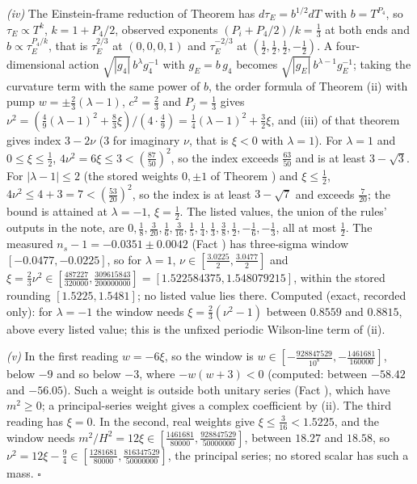 \emph{(iv)} The Einstein-frame reduction of Theorem  has $d\tau_{E} = b^{1/2}dT$ with $b = T^{P_{4}}$, so $\tau_{E} \propto T^{k}$, $k = 1 + P_{4}/2$, observed exponents $(P_{i} + P_{4}/2)/k = \tfrac13$ at both ends and $b \propto \tau_{E}^{P_{4}/k}$, that is $\tau_{E}^{2/3}$ at $(0, 0, 0, 1)$ and $\tau_{E}^{-2/3}$ at $(\tfrac12, \tfrac12, \tfrac12, -\tfrac12)$. A four-dimensional action $\sqrt{|g_{4}|}\,b^{\lambda}g_{4}^{-1}$ with $g_{E} = b\,g_{4}$ becomes $\sqrt{|g_{E}|}\,b^{\lambda - 1}g_{E}^{-1}$; taking the curvature term with the same power of $b$, the order formula of Theorem (ii) with pump $w = \pm\tfrac23(\lambda - 1)$, $c^{2} = \tfrac23$ and $P_{j} = \tfrac13$ gives $\nu^{2} = (\tfrac49(\lambda - 1)^{2} + \tfrac83\xi)/(4\cdot\tfrac49) = \tfrac14(\lambda - 1)^{2} + \tfrac32\xi$, and (iii) of that theorem gives index $3 - 2\nu$ ($3$ for imaginary $\nu$, that is $\xi < 0$ with $\lambda = 1$). For $\lambda = 1$ and $0 \le \xi \le \tfrac12$, $4\nu^{2} = 6\xi \le 3 < (\tfrac{87}{50})^{2}$, so the index exceeds $\tfrac{63}{50}$ and is at least $3 - \sqrt{3}$. For $|\lambda - 1| \le 2$ (the stored weights $0, \pm 1$ of Theorem ) and $\xi \le \tfrac12$, $4\nu^{2} \le 4 + 3 = 7 < (\tfrac{53}{20})^{2}$, so the index is at least $3 - \sqrt{7}$ and exceeds $\tfrac{7}{20}$; the bound is attained at $\lambda = -1$, $\xi = \tfrac12$. The listed values, the union of the rules' outputs in the note, are $0, \tfrac18, \tfrac{3}{20}, \tfrac16, \tfrac{3}{16}, \tfrac15, \tfrac14, \tfrac13, \tfrac38, \tfrac12, -\tfrac16, -\tfrac13$, all at most $\tfrac12$. The measured $n_{s} - 1 = -0.0351 \pm 0.0042$ (Fact ) has three-sigma window $[-0.0477, -0.0225]$, so for $\lambda = 1$, $\nu \in [\tfrac{3.0225}{2}, \tfrac{3.0477}{2}]$ and $\xi = \tfrac23\nu^{2} \in [\tfrac{487227}{320000}, \tfrac{309615843}{200000000}] = [1.522584375, 1.548079215]$, within the stored rounding $[1.5225, 1.5481]$; no listed value lies there. Computed (exact, recorded only): for $\lambda = -1$ the window needs $\xi = \tfrac23(\nu^{2} - 1)$ between $0.8559$ and $0.8815$, above every listed value; this is the unfixed periodic Wilson-line term of (ii).

\emph{(v)} In the first reading $w = -6\xi$, so the window is $w \in [-\tfrac{928847529}{10^{8}}, -\tfrac{1461681}{160000}]$, below $-9$ and so below $-3$, where $-w(w + 3) < 0$ (computed: between $-58.42$ and $-56.05$). Such a weight is outside both unitary series (Fact ), which have $m^{2} \ge 0$; a principal-series weight gives a complex coefficient by (ii). The third reading has $\xi = 0$. In the second, real weights give $\xi \le \tfrac{3}{16} < 1.5225$, and the window needs $m^{2}/H^{2} = 12\xi \in [\tfrac{1461681}{80000}, \tfrac{928847529}{50000000}]$, between $18.27$ and $18.58$, so $\nu^{2} = 12\xi - \tfrac94 \in [\tfrac{1281681}{80000}, \tfrac{816347529}{50000000}]$, the principal series; no stored scalar has such a mass. \hfill$\square$
